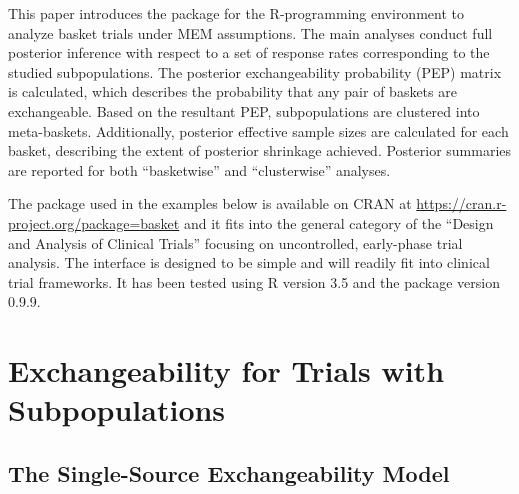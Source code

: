 This paper introduces the  \citep{basket} package for the R-programming environment to analyze basket trials under MEM assumptions. The main analyses conduct full posterior inference with respect to a set of response rates corresponding to the studied subpopulations. The posterior exchangeability probability (PEP) matrix is calculated, which describes the probability that any pair of baskets are exchangeable. Based on the resultant PEP, subpopulations are clustered into meta-baskets.  Additionally, posterior effective sample sizes are calculated for each basket, describing the extent of posterior shrinkage achieved. Posterior summaries are reported for both ``basketwise'' and ``clusterwise'' analyses.

The package used in the examples below is available on CRAN at \url{https://cran.r-project.org/package=basket} and it fits into the general category of the ``Design and Analysis of Clinical Trials'' \citep{clinicaltrialstask} focusing on uncontrolled, early-phase trial analysis. The interface is designed to be simple and will readily fit into clinical trial frameworks. It has been tested using R version 3.5 and the  package version 0.9.9.%






\section{Exchangeability for Trials with Subpopulations}

\subsection{The Single-Source Exchangeability Model}

